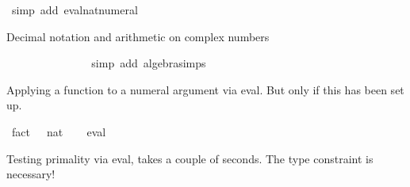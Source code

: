 \begin{isabellebody}
\isamarkupfalse%
\ {\isacharparenleft}{\kern0pt}simp\ add{\isacharcolon}{\kern0pt}\ eval{\isacharunderscore}{\kern0pt}nat{\isacharunderscore}{\kern0pt}numeral{\isacharparenright}{\kern0pt}%
\endisatagproof
{\isafoldproof}%
%
\isadelimproof
%
\endisadelimproof
%
\begin{isamarkuptext}%
Decimal notation and arithmetic on complex numbers%
\end{isamarkuptext}\isamarkuptrue%
\isamarkupfalse%
\ {\isachardoublequoteopen}{\isacharparenleft}{\kern0pt}{}\ {\isacharminus}{\kern0pt}\ {}{\isachardot}{\kern0pt}{}{\isacharasterisk}{\kern0pt}{\isasymi}{\isacharparenright}{\kern0pt}\ {\isacharasterisk}{\kern0pt}\ {\isacharparenleft}{\kern0pt}{}{\isachardot}{\kern0pt}{}\ {\isacharplus}{\kern0pt}\ {}{\isacharasterisk}{\kern0pt}{\isasymi}{\isacharparenright}{\kern0pt}\ {\isacharequal}{\kern0pt}\ {}{\isachardot}{\kern0pt}{}\ {\isacharplus}{\kern0pt}\ {}{\isachardot}{\kern0pt}{}{}{\isacharasterisk}{\kern0pt}{\isasymi}{\isachardoublequoteclose}\isanewline
%
\isadelimproof
\ \ %
\endisadelimproof
%
\isatagproof
{}\isamarkupfalse%
\ {\isacharparenleft}{\kern0pt}simp\ add{\isacharcolon}{\kern0pt}\ algebra{\isacharunderscore}{\kern0pt}simps{\isacharparenright}{\kern0pt}%
\endisatagproof
{\isafoldproof}%
%
\isadelimproof
%
\endisadelimproof
%
\begin{isamarkuptext}%
Applying a function to a numeral argument via eval. 
      But only if this has been set up.%
\end{isamarkuptext}\isamarkuptrue%
\isamarkupfalse%
\ {\isachardoublequoteopen}fact\ {}{}\ {\isacharless}{\kern0pt}\ {\isacharparenleft}{\kern0pt}{}{}{}{}{}{}{}{}{}{}{}{}{}{}{}{}{}{}{}{\isacharcolon}{\kern0pt}{\isacharcolon}{\kern0pt}nat{\isacharparenright}{\kern0pt}{\isachardoublequoteclose}\isanewline
%
\isadelimproof
\ \ %
\endisadelimproof
%
\isatagproof
{}\isamarkupfalse%
\ eval%
\endisatagproof
{\isafoldproof}%
%
\isadelimproof
%
\endisadelimproof
%
\begin{isamarkuptext}%
Testing primality via eval, takes a couple of seconds. 
      The type constraint is necessary!%

\end{isamarkuptext}
\end{isabellebody}
